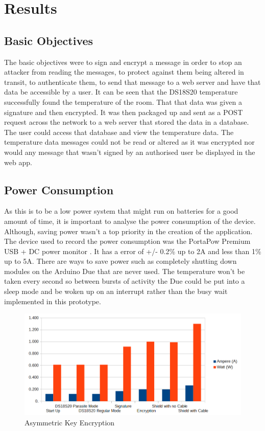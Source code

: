 \chapter{Results}
\label{res}



\section{Basic Objectives}

The basic objectives were to sign and encrypt a message in order to stop an attacker from reading the messages, to protect against them being altered in transit, to authenticate them, to send that message to a web server and have that data be accessible by a user. It can be seen that the DS18S20 temperature successfully found the temperature of the room. That that data was given a signature and then encrypted. It was then packaged up and sent as a POST request across the network to a web server that stored the data in a database. The user could access that database and view the temperature data. The temperature data messages could not be read or altered as it was encrypted nor would any message that wasn't signed by an authorised user be displayed in the web app.

\section{Power Consumption}

As this is to be a low power system that might run on batteries for a good amount of time, it is important to analyse the power consumption of the device. Although, saving power wasn't a top priority in the creation of the application. The device used to record the power consumption was the PortaPow Premium USB + DC power monitor \cite{portapow}. It has a error of +/- 0.2\% up to 2A and less than 1\% up to 5A. There are ways to save power such as completely shutting down modules on the Arduino Due that are never used. The temperature won't be taken every second so between bursts of activity the Due could be put into a sleep mode and be woken up on an interrupt rather than the busy wait implemented in this prototype.


\begin{figure}[H]
	\centering
	\includegraphics[width=1.1\linewidth]{Figures/power.png}
	\caption{Asymmetric Key Encryption}
	\label{fig:power}
\end{figure}


